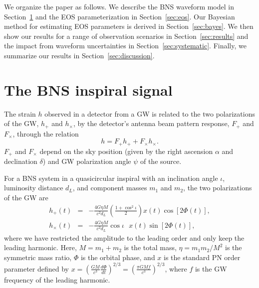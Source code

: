 \documentclass[twocolumn,prd,amssymb,aps,nofootinbib,showpacs,epsf]{revtex4}
\begin{document}
We organize the paper as follows. We describe the BNS waveform model in Section~\ref{sec:waveform} and the EOS parameterization in Section~\ref{sec:eos}. Our Bayesian method for estimating EOS parameters is derived in Section~\ref{sec:bayes}. We then show our results for a range of observation scenarios in Section~\ref{sec:results} and the impact from waveform uncertainties in Section~\ref{sec:systematic}. Finally, we summarize our results in Section~\ref{sec:discussion}.

\section{The BNS inspiral signal}
\label{sec:waveform}

The strain $h$ observed in a detector from a GW is related to the two polarizations of the GW, $h_+$ and $h_\times$, by the detector's antenna beam pattern response, $F_+$ and $F_\times$, through the relation
\begin{equation}
h = F_+ h_+ + F_\times h_\times.
\end{equation}
$F_+$ and $F_\times$ depend on the sky position (given by the right ascension $\alpha$ and declination $\delta$) and GW polarization angle $\psi$ of the source.

For a BNS system in a quasicircular inspiral with an inclination angle $\iota$, luminosity distance $d_L$, and component masses $m_1$ and $m_2$, the two polarizations of the GW are
\begin{eqnarray}
\label{eq:hoftp}
h_+(t)&=&-\frac{4G\eta M}{c^2 d_L}\left(\frac{1+\cos^2\iota}{2}\right)x(t)\cos\left[2\Phi(t)\right],\\
\label{eq:hoftc}
h_\times(t)&=&-\frac{4G\eta M}{c^2 d_L}\cos\iota\mbox{ }x(t)\sin\left[2\Phi(t)\right],
\end{eqnarray}
where we have restricted the amplitude to the leading order and only keep the leading harmonic. Here, $M=m_1+m_2$ is the total mass, $\eta=m_1 m_2/M^2$ is the symmetric mass ratio, $\Phi$ is the orbital phase, and $x$ is the standard PN order parameter defined by $x = \left( \frac{GM}{c^3}\frac{d\Phi}{dt} \right)^{2/3} = \left( \frac{\pi GM f}{c^3} \right)^{2/3}$, where $f$ is the GW frequency of the leading harmonic.
\end{document}
